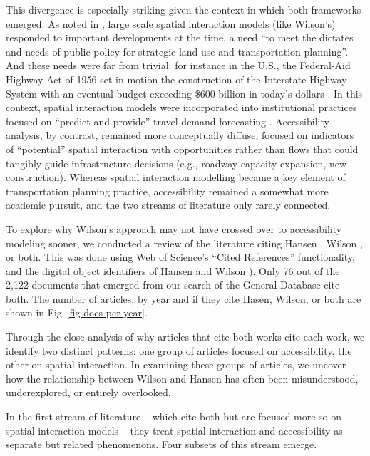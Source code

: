 \documentclass[
  10pt,
  letterpaper,
]{article}
\begin{document}
This divergence is especially striking given the context in which both
frameworks emerged. As noted in
\citep{battyChronicleScientificPlanning1994}, large scale spatial
interaction models (like Wilson's) responded to important developments
at the time, a need ``to meet the dictates and needs of public policy
for strategic land use and transportation planning''. And these needs
were far from trivial: for instance in the U.S., the Federal-Aid Highway
Act of 1956 set in motion the construction of the Interstate Highway
System with an eventual budget exceeding \$600 billion in today's
dollars
\citep{weinerUrbanTransportationPlanning2016, mdotMnDOTJoins2007}. In
this context, spatial interaction models were incorporated into
institutional practices focused on ``predict and provide'' travel demand
forecasting
\citep{kovatch1971modeling, weinerUrbanTransportationPlanning2016}.
Accessibility analysis, by contrast, remained more conceptually diffuse,
focused on indicators of ``potential'' spatial interaction with
opportunities rather than flows that could tangibly guide infrastructure
decisions (e.g., roadway capacity expansion, new construction). Whereas
spatial interaction modelling became a key element of transportation
planning practice, accessibility remained a somewhat more academic
pursuit, and the two streams of literature only rarely connected.

To explore why Wilson's approach may not have crossed over to
accessibility modeling sooner, we conducted a review of the literature
citing Hansen \citep{hansen1959}, Wilson \citep{wilson1971}, or both.
This was done using Web of Science's ``Cited References'' functionality,
and the digital object identifiers of Hansen \citep{hansen1959} and
Wilson \citep{wilson1971}). Only 76 out of the 2,122 documents that
emerged from our search of the General Database cite both. The number of
articles, by year and if they cite Hasen, Wilson, or both are shown in
Fig~\ref{fig-docs-per-year}.

Through the close analysis of why articles that cite both works cite
each work, we identify two distinct patterns: one group of articles
focused on accessibility, the other on spatial interaction. In examining
these groups of articles, we uncover how the relationship between Wilson
and Hansen has often been misunderstood, underexplored, or entirely
overlooked.

In the first stream of literature -- which cite both but are focused
more so on spatial interaction models -- they treat spatial interaction
and accessibility as separate but related phenomenons. Four subsets of
this stream emerge.
\end{document}
